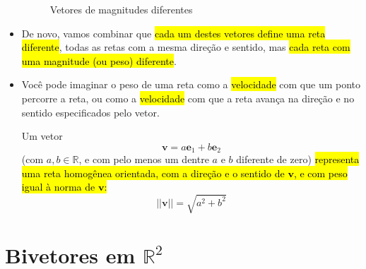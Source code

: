 \documentclass[
  letterpaper,
  DIV=11,
  numbers=noendperiod]{scrreprt}
\begin{document}
\begin{itemize}
\begin{figure}[t]
{  }

  \caption{\label{fig-vetores}Vetores de magnitudes diferentes}

  \end{figure}
\item
  De novo, vamos combinar que {\hl{cada um destes vetores define uma
  reta diferente}}, todas as retas com a mesma direção e sentido, mas
  {\hl{cada reta com uma magnitude (ou peso) diferente}}.
\item
  Você pode imaginar o peso de uma reta como a {\hl{velocidade}} com que
  um ponto percorre a reta, ou como a {\hl{velocidade}} com que a reta
  avança na direção e no sentido especificados pelo vetor.

  \begin{tcolorbox}[standard jigsaw,toprule=.15mm, bottomrule=.15mm, bottomtitle=1mm, opacityback=0, coltitle=black, toptitle=1mm, title=\textcolor{quarto-callout-note-color}{\faInfo}\hspace{0.5em}{Resumindo: vetores \(=\) retas homogêneas orientadas e com peso}, opacitybacktitle=0.6, left=2mm, titlerule=0mm, arc=.35mm, colbacktitle=quarto-callout-note-color!10!white, colback=white, rightrule=.15mm, leftrule=.75mm, colframe=quarto-callout-note-color-frame]
  Um vetor \[
  \mathbf{v} = a\mathbf{e}_{1} + b\mathbf{e}_{2}
  \] (com $a, b \in \mathbb{R}$, e com pelo menos um dentre $a$ e $b$
  diferente de zero) {\hl{representa uma reta homogênea orientada, com a
  direção e o sentido de $\mathbf{v}$, e com peso igual à norma de
  $\mathbf{v}$:}} \[
  ||\mathbf{v}|| = \sqrt{a^2 + b^2}
  \]
  \end{tcolorbox}
\end{itemize}

\hypertarget{bivetores-em-mathbbr2}{%
\section{\texorpdfstring{Bivetores em
$\mathbb{R}^2$}{Bivetores em }}\label{bivetores-em-mathbbr2}}
\end{document}
